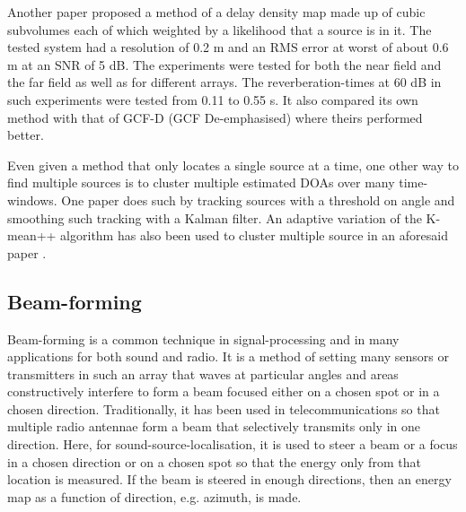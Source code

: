 \documentclass{report}
\begin{document}
Another paper \cite{boora_tdoa-based_2020} proposed a method of a delay density map made up of cubic subvolumes each of which weighted by a likelihood that a source is in it. The tested system had a resolution of 0.2 \si{m} and an RMS error at worst of about 0.6 \si{m} at an SNR of 5 \si{dB}. The experiments were tested for both the near field and the far field as well as for different arrays. The reverberation-times at 60 \si{dB} in such experiments were tested from 0.11 to 0.55 \si{s}. It also compared its own method with that of GCF-D (GCF De-emphasised) where theirs performed better.

Even given a method that only locates a single source at a time, one other way to find multiple sources is to cluster multiple estimated DOAs over many time-windows. One paper \cite{rascon_lightweight_2015} does such by tracking sources with a threshold on angle and smoothing such tracking with a Kalman filter. An adaptive variation of the K-mean++ algorithm has also been used to cluster multiple source in an aforesaid paper \cite{hu_estimation_2009}.

\subsection{Beam-forming}

Beam-forming is a common technique in signal-processing and in many applications for both sound and radio. It is a method of setting many sensors or transmitters in such an array that waves at particular angles and areas constructively interfere to form a beam focused either on a chosen spot or in a chosen direction. Traditionally, it has been used in telecommunications so that multiple radio antennae form a beam that selectively transmits only in one direction. Here, for sound-source-localisation, it is used to steer a beam or a focus in a chosen direction or on a chosen spot so that the energy only from that location is measured. If the beam is steered in enough directions, then an energy map as a function of direction, e.g. azimuth, is made.
\end{document}
